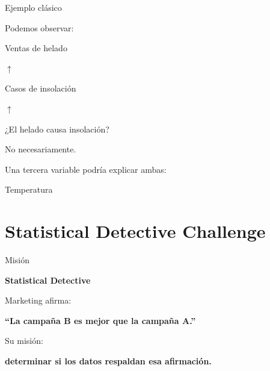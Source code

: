 \documentclass[aspectratio=169,11pt]{beamer}
\begin{document}
\begin{frame}{Ejemplo clásico}

Podemos observar:

\begin{center}

Ventas de helado

$\uparrow$

\vspace{0.3cm}

Casos de insolación

$\uparrow$

\end{center}

¿El helado causa insolación?

\vspace{0.5cm}

No necesariamente.

Una tercera variable podría explicar ambas:

\begin{center}

\Large
Temperatura
\end{center}

\end{frame}

\section{Statistical Detective Challenge}

\begin{frame}{Misión}

\begin{center}

{\Huge
\textcolor{azulmarista}{
\textbf{Statistical Detective}
}
}

\vspace{0.7cm}

Marketing afirma:

\vspace{0.3cm}

{\Large
\textbf{``La campaña B es mejor que la campaña A.''}
}

\vspace{0.8cm}

Su misión:

\vspace{0.2cm}

\textbf{determinar si los datos respaldan esa afirmación.}

\end{center}

\end{frame}
\end{document}
